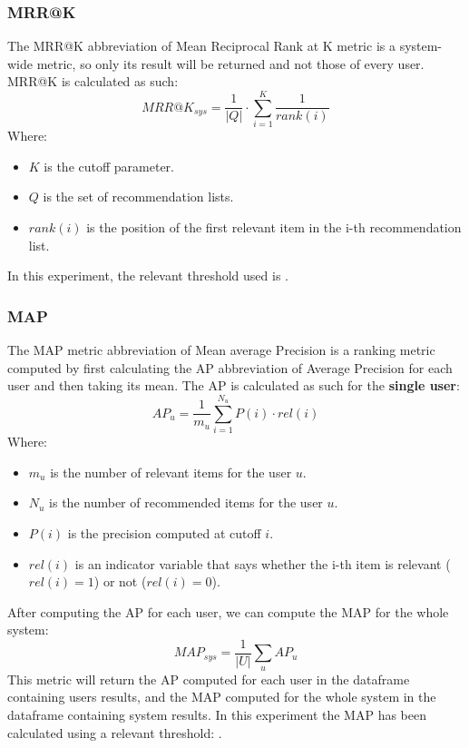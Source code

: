 \documentclass[11pt]{article}
\begin{document}
\subsubsection{MRR@K}\label{subsubsec:mrr-k}
The MRR@K abbreviation of Mean Reciprocal Rank at K metric is a system-wide metric, so only its result will be returned
and not those of every user.
MRR@K is calculated as such:
\hfill\break
\hfill\break
    \[
        MRR@K_{sys} = \frac{1}{|Q|}\cdot\sum_{i=1}^{K}\frac{1}{rank(i)}
    \]
\hfill\break
\hfill\break
    Where:
\begin{itemize}
    \item $K$ is the cutoff parameter.
    \item $Q$ is the set of recommendation lists.
    \item $rank(i)$ is the position of the first relevant item in the i-th recommendation list.
\end{itemize}
\hfill\break
\hfill\break
In this experiment, the relevant threshold used is
.
\hfill\break
\hfill\break

\subsubsection{MAP}\label{subsubsec:map}
The MAP metric abbreviation of Mean average Precision is a ranking metric computed by first calculating the AP
abbreviation of Average Precision for each user and then taking its mean.
The AP is calculated as such for the \textbf{single user}:
\hfill\break
\hfill\break
    \[
        AP_u = \frac{1}{m_u}\sum_{i=1}^{N_u}P(i)\cdot rel(i)
    \]
\hfill\break
\hfill\break
    Where:
\begin{itemize}
    \item $m_u$ is the number of relevant items for the user $u$.
    \item $N_u$ is the number of recommended items for the user $u$.
    \item $P(i)$ is the precision computed at cutoff $i$.
    \item $rel(i)$ is an indicator variable that says whether the i-th item is relevant ($rel(i)=1$) or not ($rel(i)=0$).
\end{itemize}
\hfill\break
\hfill\break
After computing the AP for each user, we can compute the MAP for the whole system:
\hfill\break
\hfill\break
    \[
        MAP_{sys} = \frac{1}{|U|}\sum_{u}AP_u
    \]
\hfill\break
\hfill\break
This metric will return the AP computed for each user in the dataframe containing users results, and the MAP
computed for the whole system in the dataframe containing system results.
In this experiment the MAP has been calculated using a relevant threshold:
.
\hfill\break
\hfill\break
\end{document}
